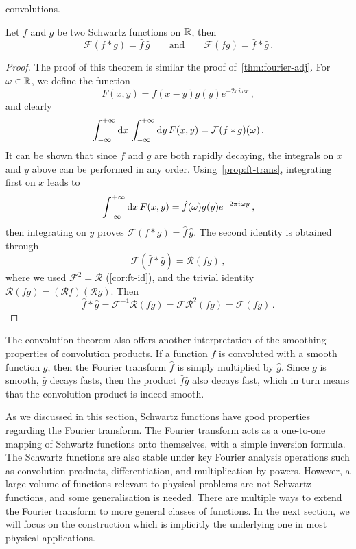 convolutions.
\begin{theorem}
  Let $f$ and $g$ be two Schwartz functions on $\mathbb{R}$, then
  \begin{equation}
    \mathcal{F}(f\ast g)=\hat{f}\,\hat{g}\qquad\text{and}\qquad
    \mathcal{F}(fg)=\hat{f}\ast\hat{g}\,.
  \end{equation}
\end{theorem}
\begin{proof}
  The proof of this theorem is similar the proof of~\cref{thm:fourier-adj}. For
  $\omega\in\mathbb{R}$, we define the function
  \begin{equation}
    F(x,y)=f(x-y)g(y)e^{-2\pi i \omega x}\,,
  \end{equation}
  and clearly
  \begin{equation}
    \int_{-\infty}^{+\infty}\mathrm{d}{x}\,\int_{-\infty}^{+\infty}\mathrm{d}{y}\,F(x,y)=\mathcal{F}(f\ast g)(\omega)\,.
  \end{equation}
  It can be shown that since $f$ and $g$ are both rapidly decaying, the integrals on $x$
  and $y$ above can be performed in any order. Using~\cref{prop:ft-trans}, integrating
  first on $x$ leads to
  \begin{equation}
    \int_{-\infty}^{+\infty}\mathrm{d}{x}\,F(x,y)=\hat{f}(\omega)g(y)e^{-2\pi i\omega y}\,,
  \end{equation}
  then integrating on $y$ proves $\mathcal{F}(f\ast g)=\hat{f}\,\hat{g}$. The second
  identity is obtained through
  \begin{equation}
    \mathcal{F}(\hat{f}\ast\hat{g})=\mathcal{R}(fg)\,,
  \end{equation}
  where we used $\mathcal{F}^2=\mathcal{R}$ (\cref{cor:ft-id}), and the trivial identity
  $\mathcal{R}(fg)=(\mathcal{R}f)(\mathcal{R}g)$. Then
  \begin{equation}
    \hat{f}\ast\hat{g}=\mathcal{F}^{-1}\mathcal{R}(fg)=\mathcal{F}\mathcal{R}^2(fg)
    =\mathcal{F}(fg)\,.
  \end{equation}
\end{proof}
The convolution theorem also offers another interpretation of the smoothing properties of
convolution products. If a function $f$ is convoluted with a smooth function $g$, then the
Fourier transform $\hat{f}$ is simply multiplied by $\hat{g}$. Since $g$ is smooth,
$\hat{g}$ decays fasts, then the product $\hat{f}\hat{g}$ also decays fast, which in turn
means that the convolution product is indeed smooth.

As we discussed in this section, Schwartz functions have good properties regarding the
Fourier transform. The Fourier transform acts as a one-to-one mapping of Schwartz
functions onto themselves, with a simple inversion formula. The Schwartz functions are
also stable under key Fourier analysis operations such as convolution products,
differentiation, and multiplication by powers. However, a large volume of functions
relevant to physical problems are not Schwartz functions, and some generalisation is
needed. There are multiple ways to extend the Fourier transform to more general classes of
functions. In the next section, we will focus on the construction which is implicitly the
underlying one in most physical applications.
